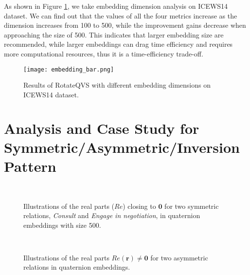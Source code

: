 \documentclass[11pt]{article}
\newcommand{\vect}[1]{\mathbf{#1}\xspace}
\newcommand{\vectr}{\vect{r}\xspace}
\begin{document}
As shown in Figure \ref{figure:dimension}, we take embedding dimension analysis on ICEWS14 dataset. We can find out that the values of all the four metrics increase as the dimension increases from 100 to 500, while the improvement gains decrease when approaching the size of 500.
This indicates that larger embedding size are recommended, while larger embeddings can drag time efficiency and requires more computational resources, thus it is a time-efficiency trade-off.

\begin{figure}[!t]
\centering
\texttt{[image: embedding\_bar.png]} 
\caption{Results of RotateQVS with different embedding dimensions on ICEWS14 dataset.}
\label{figure:dimension}
\end{figure}


\section{Analysis and Case Study for Symmetric/Asymmetric/Inversion Pattern}
\label{app:case_study_3}

\begin{figure}[!t]
  \centering
	 \\
  \caption{Illustrations of the real parts ($Re$) closing to $\vect{0}$ for two symmetric relations, \emph{Consult} and \emph{Engage in negotiation}, in quaternion embeddings with size 500.}
	\label{figure:sym}
\end{figure}

\begin{figure}[!t]
  \centering
	 \\
  \caption{Illustrations of the real parts $Re(\vectr)\neq\vect{0}$ for two asymmetric relations in quaternion embeddings.
}
	\label{figure:asym}
\end{figure}
\end{document}
